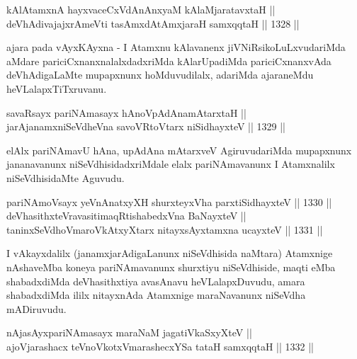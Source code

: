 
\begin{shl}
kAlAtamxnA hayxvaceCxVdAnAnxyaM kAlaMjaratavxtaH || \\
deVhAdivajajxrAmeVti tasAmxdAtAmx\s jaraH samxqqtaH \hfill || 1328 ||  
\end{shl}

\begin{artha}
ajara pada vAyxKAyxna - I Atamxnu kAlavanenx jiVNiRsikoLuLxvudariMda aMdare pariciCxnanxnalalxdadxriMda kAlarUpadiMda pariciCxnanxvAda deVhAdigaLaMte mupapxnunx hoMduvudilalx, adariMda ajaraneMdu heVLalapxTiTxruvanu.
\end{artha}

\begin{shl}
savaRsayx pariNAmasayx hAnoVpAdAnamAtarxtaH || \\
jarAjanamxniSeVdheVna savoVR\s toV\s tarx niSidhayxteV \hfill || 1329 ||  
\end{shl}

\begin{artha}
elAlx pariNAmavU hAna, upAdAna mAtarxveV AgiruvudariMda mupapxnunx jananavanunx niSeVdhisidadxriMdale elalx pariNAmavanunx I Atamxnalilx niSeVdhisidaMte Aguvudu.
\end{artha}


\begin{shl}
pariNAmoV\s sayx yeVnAnatxyXH shurxteyxVha parxtiSidhayxteV \hfill || 1330 ||  \\
deVhasithxteVravasitimaqRtishabedxVna BaNayxteV ||  \\
taninxSeVdhoV\s maroVkAtxyX\s tarx nitayxsAyx\s \s tamxna ucayxteV \hfill || 1331 ||  
\end{shl}

\begin{artha}
I vAkayxdalilx (janamxjarAdigaLanunx niSeVdhisida naMtara) Atamxnige nAshaveMba koneya pariNAmavanunx shurxtiyu niSeVdhiside, maqti eMba shabadxdiMda deVhasithxtiya avasAnavu heVLalapxDuvudu, amara shabadxdiMda ililx nitayxnAda Atamxnige maraNavanunx niSeVdha mADiruvudu.
\end{artha}

\begin{shl}
nAjasAyxpariNAmasayx maraNaM jagatiVkaSxyXteV || \\
ajoV\s jarashacx teVnoVkotxV\s marashecxYSa tataH samxqqtaH \hfill || 1332 ||  
\end{shl}

